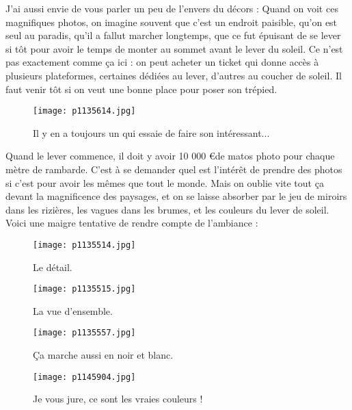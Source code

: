 \documentclass{book}
\begin{document}
J'ai aussi envie de vous parler un peu de l'envers du décors : Quand on voit ces magnifiques photos, on imagine souvent que c'est un endroit paisible, qu'on est seul au paradis, qu'il a fallut marcher longtemps, que ce fut épuisant de se lever si tôt pour avoir le temps de monter au sommet avant le lever du soleil. Ce n'est pas exactement comme ça ici : on peut acheter un ticket qui donne accès à plusieurs plateformes, certaines dédiées au lever, d'autres au coucher de soleil. Il faut venir tôt si on veut une bonne place pour poser son trépied.


\begin{figure}[h]
\centering
\texttt{[image: p1135614.jpg]}
\caption*{Il y en a toujours un qui essaie de faire son intéressant...}
\end{figure}

Quand le lever commence, il doit y avoir 10 000 \euro de matos photo pour chaque mètre de rambarde. C'est à se demander quel est l'intérêt de prendre des photos si c'est pour avoir les mêmes que tout le monde. Mais on oublie vite tout ça devant la magnificence des paysages, et on se laisse absorber par le jeu de miroirs dans les rizières, les vagues dans les brumes, et les couleurs du lever de soleil. Voici une maigre tentative de rendre compte de l'ambiance :


\begin{figure}[h]
\centering
\texttt{[image: p1135514.jpg]}
\caption*{Le détail.}
\end{figure}


\begin{figure}[h]
\centering
\texttt{[image: p1135515.jpg]}
\caption*{La vue d'ensemble.}
\end{figure}


\begin{figure}[h]
\centering
\texttt{[image: p1135557.jpg]}
\caption*{Ça marche aussi en noir et blanc.}
\end{figure}


\begin{figure}[h]
\centering
\texttt{[image: p1145904.jpg]}
\caption*{Je vous jure, ce sont les vraies couleurs !}
\end{figure}
\end{document}
